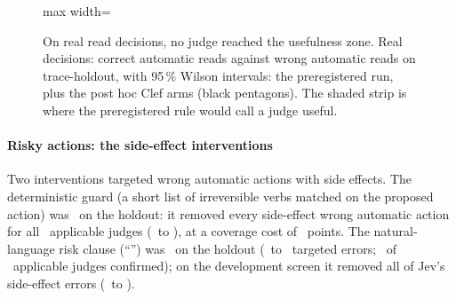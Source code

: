 \begin{figure}[tbp]
\centering
\begin{adjustbox}{max width=\linewidth}\end{adjustbox}
\caption{On real read decisions, no judge reached the usefulness zone. Real decisions: correct automatic reads against wrong automatic reads on trace-holdout, with 95\,\% Wilson
intervals: the preregistered run, plus the post hoc Clef arms (black pentagons). The shaded strip is where the
preregistered rule would call a judge useful.}
\label{fig:reads}
\end{figure}

\paragraph{Risky actions: the side-effect interventions} Two interventions targeted wrong automatic actions with side
effects. The deterministic guard (a short list of irreversible verbs matched on the proposed action) was
\ITwoHoldConfirmed\ on the holdout: it removed every side-effect wrong automatic action for all
\ITwoHoldNApplicable\ applicable judges (\ITwoHoldBefore\ to \ITwoHoldAfter), at a coverage cost of
\ITwoHoldCovCostRange\ points. The natural-language risk clause (``\IOneClause'') was \IOneHoldConfirmed\ on the
holdout (\IOneHoldBefore\ to \IOneHoldAfter\ targeted errors; \IOneHoldNArmConfirmed\ of \IOneHoldNApplicable\
applicable judges confirmed); on the development screen it removed all of Jev's side-effect errors
(\IOneDevJevClBefore\ to \IOneDevJevClAfter).


